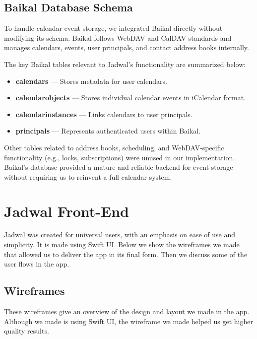 \subsection{Baikal Database Schema}

To handle calendar event storage, we integrated Baikal directly without modifying its schema. Baikal follows WebDAV and CalDAV standards and manages calendars, events, user principals, and contact address books internally.

The key Baikal tables relevant to Jadwal's functionality are summarized below:

\begin{itemize}
    \item \textbf{calendars} — Stores metadata for user calendars.
    \item \textbf{calendarobjects} — Stores individual calendar events in iCalendar format.
    \item \textbf{calendarinstances} — Links calendars to user principals.
    \item \textbf{principals} — Represents authenticated users within Baikal.
\end{itemize}

Other tables related to address books, scheduling, and WebDAV-specific functionality (e.g., locks, subscriptions) were unused in our implementation. Baikal's database provided a mature and reliable backend for event storage without requiring us to reinvent a full calendar system.

\section{Jadwal Front-End}

Jadwal was created for universal users, with an emphasis on ease of use and simplicity. It is made using Swift UI. Below we show the wireframes we made that allowed us to deliver the app in its final form. Then we discuss some of the user flows in the app.

\subsection{Wireframes}

These wireframes give an overview of the design and layout we made in the app. Although we made is using Swift UI, the wireframe we made helped us get higher quality results.


